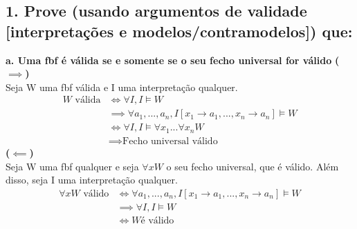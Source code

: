 \subsection*{1. Prove (usando argumentos de validade [interpretações e modelos/contramodelos]) que:}

\textbf{a. Uma fbf é válida se e somente se o seu fecho universal for válido}
\textbf{($\implies$)}
\\
Seja W uma fbf válida e I uma interpretação qualquer. 
\begin{align*}
    W \text{ válida} 
    &\Longleftrightarrow \forall I, I  \models W \tag*{(Def. Val.)} \\
    &\implies \forall a_1,...,a_n,I[x_1\rightarrow a_1,...,x_n \rightarrow a_n] \models W \tag*{(Semântica $\forall x)$} \\
    &\Longleftrightarrow \forall I, I \models \forall x_1 ... \forall x_n W \tag*{(Def. fecho universal)} \\
    &\implies \text{Fecho universal válido}
\end{align*}
\textbf{($\impliedby$)}
\\
Seja W uma fbf qualquer e seja $\forall xW$ o seu fecho universal, que é válido. Além disso, seja I uma interpretação qualquer. 
\begin{align*}
    \forall x W  \text{ válido} &\Longleftrightarrow \forall a_1,...,a_n,I[x_1\rightarrow a_1,...,x_n \rightarrow a_n] \models W \tag*{(Def.)} \\
    &\implies \forall I, I \models W \tag*{(Semântica $\forall x$)}\\
    &\Longleftrightarrow W \text{é válido} \tag*{(Def. Val.)}
\end{align*}

